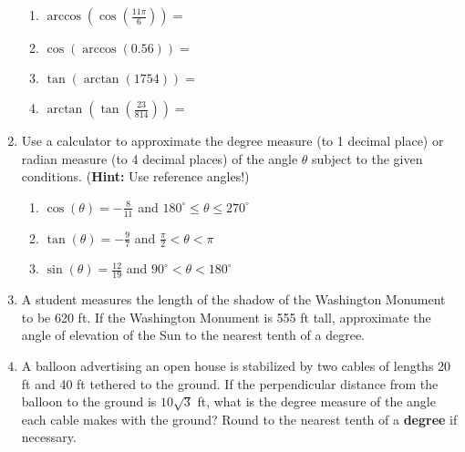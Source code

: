 \begin{enumerate}
\begin{enumerate}
\item $\arccos \left(\cos\left(\frac{11\pi}{6}\right)\right)=$
\vfill


\item $\cos \left(\arccos\left( 0.56 \right)\right) = $
\vfill

\item $\tan \left( \arctan\left(1754\right) \right)=$
\vfill

\item $\arctan \left( \tan\left( \frac{23}{814}\right)\right)=$
\vfill

\end{enumerate}


\clearpage

\item Use a calculator to approximate the degree measure (to 1 decimal place) or radian measure (to 4 decimal places) of the angle $\theta$ subject to the given conditions. (\textbf{Hint:  }Use reference angles!)

\begin{enumerate}
\item $\displaystyle \cos(\theta)=-\frac{8}{11}$ and $180^\circ \leq \theta \leq 270^\circ$
\vfill
\item $\displaystyle \tan(\theta)=-\frac{9}{7}$ and $\frac{\pi}{2}<\theta< \pi$
\vfill
\item $\displaystyle \sin(\theta)=\frac{12}{19}$ and $90^\circ < \theta <180^\circ$
\vfill
\end{enumerate}


\clearpage



\item A student measures the length of the shadow of the Washington
  Monument to be 620 ft. If the Washington Monument is 555 ft tall,
  approximate the angle of elevation of the Sun to the nearest tenth
  of a degree.

  \vfill

\item A balloon advertising an open house is stabilized by two cables
  of lengths 20 ft and 40 ft tethered to the ground.  If the
  perpendicular distance from the balloon to the ground is
  $10\sqrt{3}$ ft, what is the degree measure of the angle each cable
  makes with the ground?  Round to the nearest tenth of a
  \textbf{degree} if necessary.

  \vfill


\end{enumerate}


